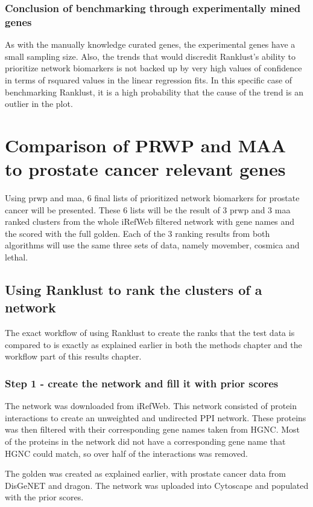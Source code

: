 \subsection{Conclusion of benchmarking through experimentally mined genes}
As with the manually knowledge curated genes, the experimental genes have
a small sampling size. Also, the trends that would discredit Ranklust's ability
to prioritize network biomarkers is not backed up by very high values of
confidence in terms of \gls{rsquared} values in the linear regression fits. In
this specific case of benchmarking Ranklust, it is a high probability that the
cause of the trend is an outlier in the plot.

\chapter{Comparison of PRWP and MAA to prostate cancer relevant genes}
Using \gls{prwp} and \gls{maa}, 6 final lists of prioritized network biomarkers
for prostate cancer will be presented. These 6 lists will be the result of
3 \gls{prwp} and 3 \gls{maa} ranked clusters from the whole iRefWeb filtered
network with gene names and the scored with the full \gls{golden}. Each of the
3 ranking results from both algorithms will use the same three sets of data,
namely movember, cosmica and lethal.

\section{Using Ranklust to rank the clusters of a network}
The exact workflow of using Ranklust to create the ranks that the test data is
compared to is exactly as explained earlier in both the methods chapter and the
workflow part of this results chapter.

\subsection{Step 1 - create the network and fill it with prior scores}
The network was downloaded from iRefWeb. This network consisted of protein
interactions to create an unweighted and undirected PPI network. These proteins
was then filtered with their corresponding gene names taken from HGNC. Most of
the proteins in the network did not have a corresponding gene name that HGNC
could match, so over half of the interactions was removed.

The \gls{golden} was created as explained earlier, with prostate cancer data
from DisGeNET and \gls{dragon}. The network was uploaded into Cytoscape and
populated with the prior scores. 

